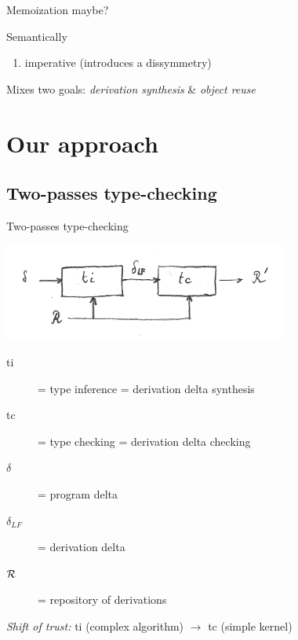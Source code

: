 \documentclass[ignorenonframetext,red]{beamer}
\begin{document}
\begin{frame}[fragile]{Memoization maybe?}
\begin{block}{Semantically}
\begin{enumerate}
{        
      }
      \pause
    \item[\itminus] imperative (introduces a dissymmetry)
    \end{enumerate}
  \end{block}
  \pause
  {\footnotesize Mixes two goals:} {\large \it derivation synthesis}
  {\footnotesize \&} {\large \it object reuse}
\end{frame}

\section{Our approach}

\subsection{Two-passes type-checking}

\begin{frame}{Two-passes type-checking}
  \begin{center}
    \includegraphics[width=0.7\textwidth]{images/tc-delta2.png}
  \end{center}
  \begin{description}
    \item[\textsf{ti}] = type inference = derivation delta synthesis
    \item[\textsf{tc}] = type checking = derivation delta checking
    \item[$\delta$] = program delta
    \item[$\delta_{LF}$] = derivation delta
    \item[$\mathcal{R}$] = repository of derivations
  \end{description}
  \vspace{1em}
  \pause
  \emph{Shift of trust:} \textsf{ti} (complex algorithm) $\to$ \textsf{tc}
  (simple kernel)
\end{frame}
\end{document}

